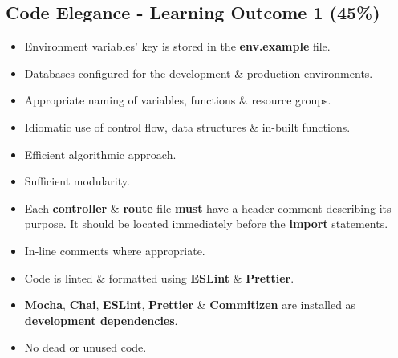 \documentclass{article}
\begin{document}
\subsection*{Code Elegance - Learning Outcome 1 (45\%)}
\begin{itemize}
	\item Environment variables' key is stored in the \textbf{env.example} file. 
	\item Databases configured for the development \& production environments.
	\item Appropriate naming of variables, functions \& resource groups.
	\item Idiomatic use of control flow, data structures \& in-built functions.
	  \item Efficient algorithmic approach.
  \item Sufficient modularity.
	\item Each \textbf{controller} \& \textbf{route} file \textbf{must} have a header comment describing its purpose. It should be located immediately before the \textbf{import} statements.
  \item In-line comments where appropriate.
	\item Code is linted \& formatted using \textbf{ESLint} \& \textbf{Prettier}.
	\item \textbf{Mocha}, \textbf{Chai}, \textbf{ESLint}, \textbf{Prettier} \& \textbf{Commitizen} are installed as \textbf{development dependencies}.	
	\item No dead or unused code.
\end{itemize}
\end{document}
